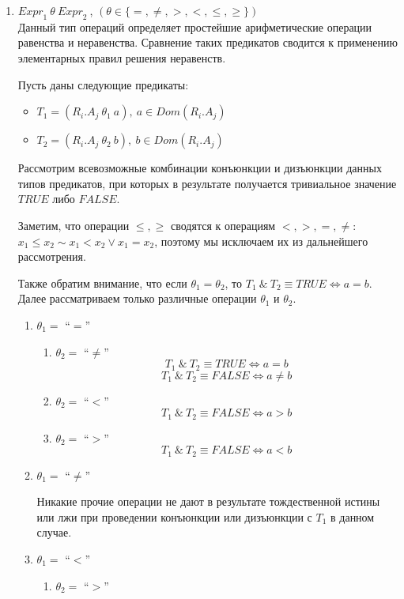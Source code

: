 \documentclass[10pt,a4paper]{article}
\def \n #1{\mathit{#1}}
\begin{document}
\begin{enumerate}
\item $ \n{Expr}_1\ \theta\ \n{Expr}_2\ $, $(\theta \in \{=, \neq, >, <, \leq, \geq\})$\\
Данный тип операций определяет простейшие арифметические операции равенства и неравенства. Сравнение
таких предикатов сводится к применению элементарных правил решения неравенств.

Пусть даны следующие предикаты:
\begin{itemize}
    \item $T_1 = (R_i.A_j\ \theta_1\ a),\ a \in Dom(R_i.A_j)$
    \item $T_2 = (R_i.A_j\ \theta_2\ b),\ b \in Dom(R_i.A_j)$
\end{itemize}

Рассмотрим всевозможные комбинации конъюнкции и дизъюнкции данных типов предикатов, при которых в
результате получается тривиальное значение $\n{TRUE}$ либо $\n{FALSE}$.

Заметим, что операции $\leq,
\geq$ сводятся к операциям $<, >, =, \neq$: $x_1 \leq x_2 \sim x_1 < x_2 \vee x_1 = x_2$, поэтому мы исключаем их из дальнейшего рассмотрения.

Также обратим внимание, что если $\theta_1 = \theta_2$, то $T_1\ \&\ T_2 \equiv \n{TRUE} \iff a = b$.
Далее рассматриваем только различные операции $\theta_1$ и $\theta_2$.

\begin{enumerate}[label=\Roman*]
  \item $\theta_1 = $ ``$=$''
  \begin{enumerate}
  	\item $\theta_2 = $ ``$\neq$''  	
  	$$T_1\ \&\ T_2 \equiv \n{TRUE} \iff a = b$$
  	$$T_1\ \&\ T_2 \equiv \n{FALSE} \iff a \neq b$$

  	\item $\theta_2 = $ ``$<$''
  	$$T_1\ \&\ T_2 \equiv \n{FALSE} \iff a > b$$

  	\item $\theta_2 = $ ``$>$''
  	$$T_1\ \&\ T_2 \equiv \n{FALSE} \iff a < b$$
  \end{enumerate}

  \item $\theta_1 = $ ``$\neq$''

  Никакие прочие операции не дают в результате тождественной истины или лжи при проведении конъюнкции или дизъюнкции с $T_1$ в данном случае.

  \item $\theta_1 = $ ``$<$''
  \begin{enumerate}
  	\item $\theta_2 = $ ``$>$''
  	

\end{enumerate}
\end{enumerate}
\end{enumerate}
\end{document}
